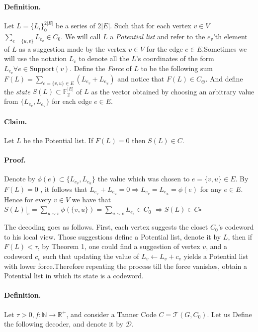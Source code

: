 \documentclass{article}
\begin{document}
\begin{multicols*}{2}
\paragraph{Definition.}Let $L = \{L_{i}\}^{2|E|}_{0}$  be a series of $2|E|$. Such that for each vertex $ v \in V$ $\sum_{ e = \{u,v\} }{ L_{e_v} } \in C_{0}$. We will call $L$ a \textit{Potential list} and refer to the $e_{v}$'th element of $L$ as a suggestion made by the vertex $v \in V$ for the edge $e \in E$.Sometimes we will use the notation $L_{v}$ to denote all the $L$'s coordinates of the form $ L_{e_{v}} \forall e \in \text{Support} \left( v \right) $. Define the \textit{Force} of $L$ to be the following sum $  F\left( L \right) = \sum_{e = \{v,u\} \in E }{ \left(L_{e_v} + L_{e_u}\right) }$ and notice that $ F\left( L \right) \in C_{\oplus}$. And define the \textit{state} $S(L) \subset \mathbb{F}^{|E|}_{2}$ of $L$ as the vector obtained by choosing an arbitrary value from $ \{ L_{e_v}, L_{e_u} \}$ for each edge $e \in E$.  
\paragraph{Claim.} Let $L$ be the Potential list. If $F(L)=0$ then $S(L)\in C$.
\paragraph{Proof.} Denote by $\phi\left( e \right) \subset \{ L_{e_v}, L_{e_u} \}$ the value which was chosen to $e = \{v,u\} \in E$. By $F\left(L\right) = 0$ , it follows that $ L_{e_v} + L_{e_u} = 0 \Rightarrow L_{e_v} = L_{e_u} = \phi\left( e \right) $ for any $e \in E$. Hence for every $v\in V$ we have that $ S\left( L \right)|_{v} = \sum_{u \sim v}{ \phi\left( \{v,u\} \right) } =  \sum_{u \sim v}{ L_{e_v }} \in C_{0}$ $ \Rightarrow S\left( L \right) \in C \square$   

The decoding goes as follows. First, each vertex suggests the closet $C_{0}$'s codeword to his local view. Those suggestions define a Potential list, denote it by $L$, then if $F\left( L \right) <\tau$, by Theorem 1, one could find a suggestion of vertex $v$, and a codeword $c_v$ such that updating the value of $L_{v} \leftarrow L_{v} + c_{v}$ yields a Potential list with lower force.Therefore repeating the process till the force vanishes, obtain a Potential list in which its state is a codeword. 
\paragraph{Definition.} Let $\tau > 0, f : \mathbb{N} \rightarrow \mathbb{R^{+}}$, and consider a Tanner Code $C = \mathcal{T}\left( G, C_{0} \right)$. Let us Define the following decoder, and denote it by $\mathcal{D}$.  

\end{multicols*}
\end{document}
